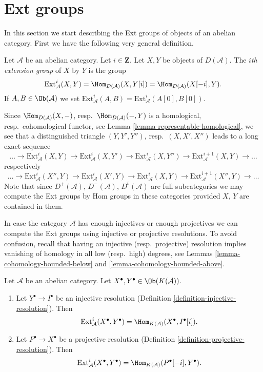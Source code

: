 \section{Ext groups}
\label{section-ext}

\noindent
In this section we start describing the Ext groups of objects
of an abelian category. First we have the following very general
definition.

\begin{definition}
\label{definition-ext}
Let $\mathcal{A}$ be an abelian category. Let $i \in \mathbf{Z}$. Let
$X, Y$ be objects of $D(\mathcal{A})$. The {\it $i$th extension group}
of $X$ by $Y$ is the group
$$
\text{Ext}^i_\mathcal{A}(X, Y) =
\Hom_{D(\mathcal{A})}(X, Y[i]) =
\Hom_{D(\mathcal{A})}(X[-i], Y).
$$
If $A, B \in \Ob(\mathcal{A})$ we set
$\text{Ext}^i_\mathcal{A}(A, B) = \text{Ext}^i_\mathcal{A}(A[0], B[0])$.
\end{definition}

\noindent
Since $\Hom_{D(\mathcal{A})}(X, -)$,
resp.\ $\Hom_{D(\mathcal{A})}(-, Y)$ is a homological,
resp.\ cohomological functor, see
Lemma \ref{lemma-representable-homological},
we see that a distinguished triangle $(Y, Y', Y'')$,
resp.\ $(X, X', X'')$ leads to a long exact sequence
$$
\ldots \to
\text{Ext}^i_\mathcal{A}(X, Y) \to
\text{Ext}^i_\mathcal{A}(X, Y') \to
\text{Ext}^i_\mathcal{A}(X, Y'') \to
\text{Ext}^{i + 1}_\mathcal{A}(X, Y) \to \ldots
$$
respectively
$$
\ldots \to
\text{Ext}^i_\mathcal{A}(X'', Y) \to
\text{Ext}^i_\mathcal{A}(X', Y) \to
\text{Ext}^i_\mathcal{A}(X, Y) \to
\text{Ext}^{i + 1}_\mathcal{A}(X'', Y) \to \ldots
$$
Note that since $D^+(\mathcal{A})$, $D^-(\mathcal{A})$, $D^b(\mathcal{A})$
are full subcategories we may compute the Ext groups by Hom groups
in these categories provided $X$, $Y$ are contained in them.

\noindent
In case the category $\mathcal{A}$ has enough injectives or enough
projectives we can compute the Ext groups using injective or
projective resolutions. To avoid confusion, recall that having an
injective (resp.\ projective) resolution implies vanishing of homology
in all low (resp.\ high) degrees, see
Lemmas \ref{lemma-cohomology-bounded-below} and
\ref{lemma-cohomology-bounded-above}.

\begin{lemma}
\label{lemma-compute-ext-resolutions}
Let $\mathcal{A}$ be an abelian category.
Let $X^\bullet, Y^\bullet \in \Ob(K(\mathcal{A}))$.
\begin{enumerate}
\item Let $Y^\bullet \to I^\bullet$ be an injective resolution
(Definition \ref{definition-injective-resolution}). Then
$$
\text{Ext}^i_\mathcal{A}(X^\bullet, Y^\bullet) =
\Hom_{K(\mathcal{A})}(X^\bullet, I^\bullet[i]).
$$
\item Let $P^\bullet \to X^\bullet$ be a projective resolution
(Definition \ref{definition-projective-resolution}). Then
$$
\text{Ext}^i_\mathcal{A}(X^\bullet, Y^\bullet) =
\Hom_{K(\mathcal{A})}(P^\bullet[-i], Y^\bullet).
$$
\end{enumerate}
\end{lemma}

